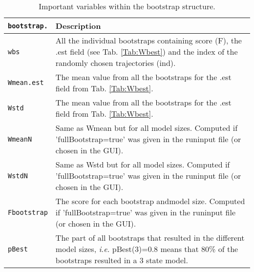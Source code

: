 \begin{table}[ht]
\caption{Important variables within the bootstrap structure.} 
\centering 
\begin{tabular*}{13.1cm}{ | m{2.7cm} | m{9.5cm} | } 
\hline
\texttt{bootstrap.} 			& \textbf{Description} \\ [0.5ex] 
\hline\hline 
\texttt{wbs} 						& All the individual bootstraps containing score (F), the .est field (see Tab. \ref{Tab:Wbest}) and the index of the randomly chosen trajectories (ind).\\[0.5ex]   \hline 
\texttt{Wmean.est}  						& The mean value from all the bootstraps for the .est field from Tab. \ref{Tab:Wbest}.\\[0.5ex]  \hline 
\texttt{Wstd}				 	& The mean value from all the bootstraps for the .est field from Tab. \ref{Tab:Wbest}.\\[0.5ex]  \hline 
\texttt{WmeanN}				& Same as Wmean but for all model sizes. Computed if 'fullBootstrap=true' was given in the runinput file (or chosen in the GUI).\\[0.5ex]  \hline 
\texttt{WstdN}					& Same as Wstd but for all model sizes. Computed if 'fullBootstrap=true' was given in the runinput file (or chosen in the GUI).\\[0.5ex]  \hline 
\texttt{Fbootstrap}			& The score for each bootstrap andmodel size. Computed if 'fullBootstrap=true' was given in the runinput file (or chosen in the GUI).\\[0.5ex]  \hline 
\texttt{pBest}					& The part of all bootstraps that resulted in the different model sizes, \textit{i.e.} pBest(3)=0.8 means that 80\% of the bootstraps resulted in a 3 state model.\\[1ex] %
\hline 
\end{tabular*}\label{Tab:bootstrap} 
\end{table}


\newpage